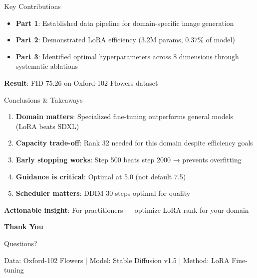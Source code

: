 \documentclass{beamer}
\begin{document}
\begin{frame}{Key Contributions}
\begin{itemize}
    \item \textbf{Part 1}: Established data pipeline for domain-specific image generation

    \item \textbf{Part 2}: Demonstrated LoRA efficiency (3.2M params, 0.37\% of model)

    \item \textbf{Part 3}: Identified optimal hyperparameters across 8 dimensions through systematic ablations
\end{itemize}

\vspace{0.5cm}
\begin{center}
\textbf{Result}: FID 75.26 on Oxford-102 Flowers dataset
\end{center}
\end{frame}

\begin{frame}{Conclusions \& Takeaways}
\begin{enumerate}
    \item \textbf{Domain matters}: Specialized fine-tuning outperforms general models (LoRA beats SDXL)

    \item \textbf{Capacity trade-off}: Rank 32 needed for this domain despite efficiency goals

    \item \textbf{Early stopping works}: Step 500 beats step 2000 → prevents overfitting

    \item \textbf{Guidance is critical}: Optimal at 5.0 (not default 7.5)

    \item \textbf{Scheduler matters}: DDIM 30 steps optimal for quality
\end{enumerate}

\vspace{0.5cm}
\textbf{Actionable insight}: For practitioners — optimize LoRA rank for your domain
\end{frame}

\begin{frame}[plain]
\begin{center}
\Large \textbf{Thank You}

\vspace{1cm}
Questions?

\vspace{1cm}
\small Data: Oxford-102 Flowers | Model: Stable Diffusion v1.5 | Method: LoRA Fine-tuning
\end{center}
\end{frame}
\end{document}
